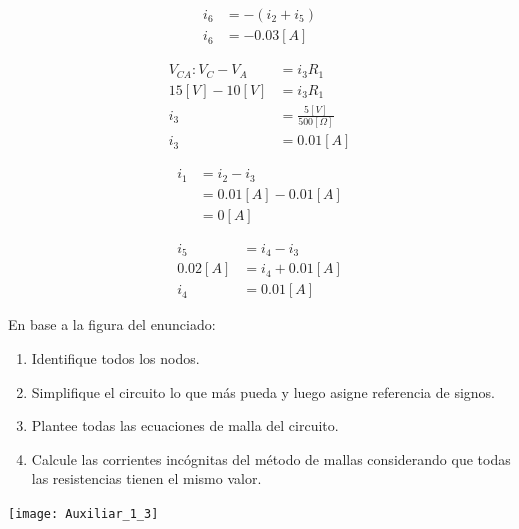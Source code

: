 \documentclass[
  11pt,
  letterpaper,
   addpoints,
  ]{exam}
\begin{document}
\begin{questions}
\begin{solution}
\begin{enumerate}
\begin{multicols}{2}
        \begin{align*}
            i_6 &= -(i_2 + i_5) \\
            i_6 &= -0.03[A]
        \end{align*}
    
        \columnbreak %
    
        \begin{align*}
            V_{CA} : V_C - V_A &= i_3 R_1 \\
            15[V] - 10[V] &= i_3 R_1 \\
            i_3 &= \frac{5[V]}{500[\Omega]} \\
            i_3 &= 0.01[A]
        \end{align*}
    
        \begin{align*}
            i_1 &= i_2 - i_3 \\
                &= 0.01[A] - 0.01[A] \\
                &= 0[A]
        \end{align*}
    
        \begin{align*}
            i_5 &= i_4 - i_3 \\
            0.02[A] &= i_4 + 0.01[A] \\
            i_4 &= 0.01[A]
        \end{align*}
    
    \end{multicols}
    


    \end{enumerate}

\end{solution}
\question En base a la figura del enunciado:
\begin{enumerate}
    \item Identifique todos los nodos.
    \item Simplifique el circuito lo que más pueda y luego asigne referencia de signos.
    \item Plantee todas las ecuaciones de malla del circuito. 
    \item Calcule las corrientes incógnitas del método de mallas considerando que todas las resistencias tienen el mismo valor.
\end{enumerate}
\begin{center}
    \texttt{[image: Auxiliar\_1\_3]}
\end{center}
\end{questions}
\end{document}
